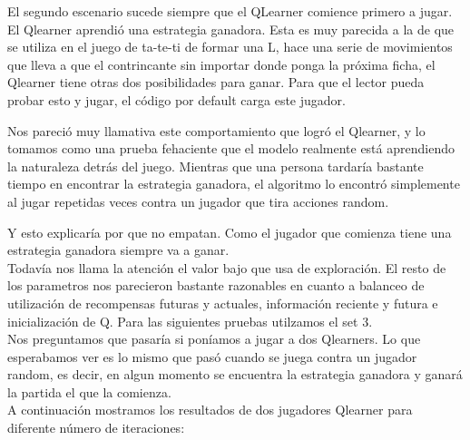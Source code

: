 El segundo escenario sucede siempre que el QLearner comience primero a jugar. El Qlearner aprendi\'o una estrategia ganadora. Esta es muy parecida a la de que se utiliza en el juego de ta-te-ti de formar una L, hace una serie de movimientos que lleva a que el contrincante sin importar donde ponga la pr\'oxima ficha, el Qlearner tiene otras dos posibilidades para ganar. Para que el lector pueda probar esto y jugar, el c\'odigo por default carga este jugador.

Nos pareci\'o muy llamativa este comportamiento que logr\'o el Qlearner, y lo tomamos como una prueba fehaciente que el modelo realmente est\'a aprendiendo la naturaleza detr\'as del juego. Mientras que una persona tardar\'ia bastante tiempo en encontrar la estrategia ganadora, el algoritmo lo encontr\'o simplemente al jugar repetidas veces contra un jugador que tira acciones random.

Y esto explicaría por que no empatan. Como el jugador que comienza tiene una estrategia ganadora siempre va a ganar.\\

Todavía nos llama la atención el valor bajo que usa de exploración. El resto de los parametros nos parecieron bastante razonables en cuanto a balanceo de utilización de recompensas futuras y actuales, información reciente y futura e inicialización de Q.
Para las siguientes pruebas utilzamos el set 3.\\

Nos preguntamos que pasaría si poníamos a jugar a dos Qlearners. Lo que esperabamos ver es lo mismo que pasó cuando se juega contra un jugador random, es decir, en algun momento se encuentra la estrategia ganadora y ganará la partida el que la comienza.\\

A continuación mostramos los resultados de dos jugadores Qlearner para diferente número de iteraciones:

